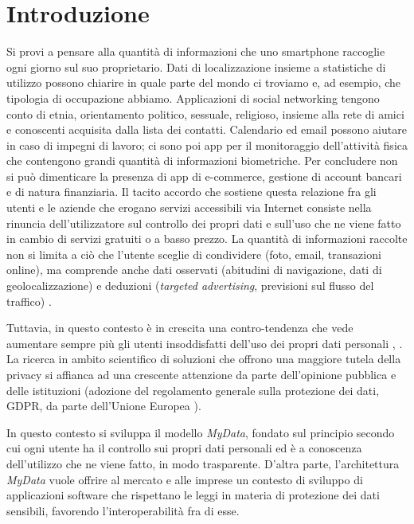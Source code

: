 \chapter{Introduzione}
\label{Introduzione}
\thispagestyle{empty}

\noindent Si provi a pensare alla quantit\`a di informazioni che uno smartphone raccoglie ogni giorno sul suo proprietario. Dati di localizzazione insieme a statistiche di utilizzo possono chiarire in quale parte del mondo ci troviamo e, ad esempio, che tipologia di occupazione abbiamo. Applicazioni di social networking tengono conto di etnia, orientamento politico, sessuale, religioso, insieme alla rete di amici e conoscenti acquisita dalla lista dei contatti. Calendario ed email possono aiutare in caso di impegni di lavoro; ci sono poi app per il monitoraggio dell’attivit\`a fisica che contengono grandi quantit\`a di informazioni biometriche. Per concludere non si pu\`o dimenticare la presenza di app di e-commerce, gestione di account bancari e di natura finanziaria. Il tacito accordo che sostiene questa relazione fra gli utenti e le aziende che erogano servizi accessibili via Internet consiste nella rinuncia dell’utilizzatore sul controllo dei propri dati e sull’uso che ne viene fatto in cambio di servizi gratuiti o a basso prezzo. La quantit\`a di informazioni raccolte non si limita a ci\`o che l’utente sceglie di condividere (foto, email, transazioni online), ma comprende anche dati osservati (abitudini di navigazione, dati di geolocalizzazione) e deduzioni (\textit{targeted advertising}, previsioni sul flusso del traffico) \cite{IAFmDavis}.

Tuttavia, in questo contesto \`e in crescita una contro-tendenza che vede aumentare sempre pi\`u gli utenti insoddisfatti dell’uso dei propri dati personali \cite{orangeDigitalTrust}, \cite{wefreport}. La ricerca in ambito scientifico di soluzioni che offrono una maggiore tutela della privacy si affianca ad una crescente attenzione da parte dell’opinione pubblica e delle istituzioni (adozione del regolamento generale sulla protezione dei dati, GDPR, da parte dell’Unione Europea \cite{gdpr}).

In questo contesto si sviluppa il modello \textit{MyData}, fondato sul principio secondo cui ogni utente ha il controllo sui propri dati personali ed \`e a conoscenza dell’utilizzo che ne viene fatto, in modo trasparente. D’altra parte, l’architettura \textit{MyData} vuole offrire al mercato e alle imprese un contesto di sviluppo di applicazioni software che rispettano le leggi in materia di protezione dei dati sensibili, favorendo l’interoperabilit\`a fra di esse.

